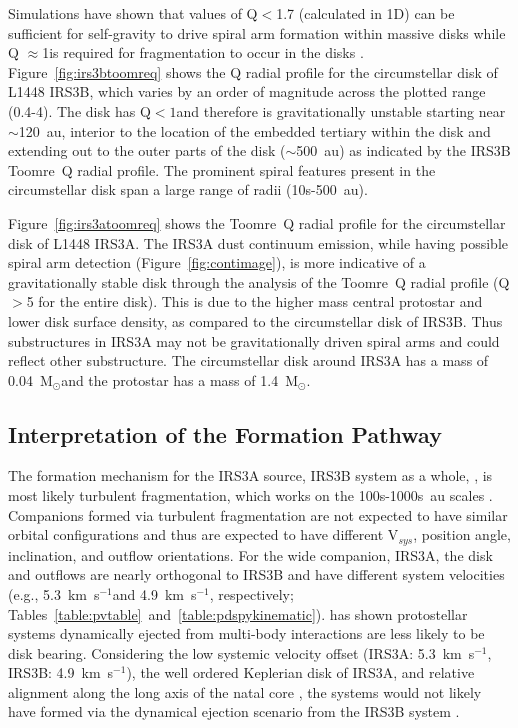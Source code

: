 \documentclass[twocolumn, 12pt,trackchanges]{aastex63}
\newcommand{\ab}{$\sim$}
\newcommand{\solm}{M$_{\odot}$}
\begin{document}
Simulations have shown that values of Q$<$1.7 (calculated in 1D) can be sufficient for self-gravity to drive spiral arm formation within massive disks while Q $\approx$1\space is required for fragmentation to occur in the disks \citep[][]{2010ApJ...710.1375K}. Figure~\ref{fig:irs3btoomreq} shows the Q radial profile for the circumstellar disk of L1448 IRS3B, which varies by an order of magnitude across the plotted range (0.4-4). The disk has Q$<1$\space and therefore is  gravitationally unstable starting near \ab120~au, interior to the location of the embedded tertiary within the disk and extending out to the outer parts of the disk (\ab500~au) as indicated by the IRS3B Toomre~Q radial profile. The prominent spiral features present in the circumstellar disk span a large range of radii (10s-500~au).

Figure~\ref{fig:irs3atoomreq} shows the Toomre~Q radial profile for the circumstellar disk of L1448 IRS3A. The IRS3A dust continuum emission, while having possible spiral arm detection (Figure~\ref{fig:contimage}), is more indicative of a gravitationally stable disk through the analysis of the Toomre~Q radial profile (Q$>$5 for the entire disk). This is due to the higher mass central protostar and lower disk surface density, as compared to the circumstellar disk of IRS3B. Thus substructures in IRS3A may not be gravitationally driven spiral arms and could reflect other substructure. The circumstellar disk around IRS3A has a mass of 0.04~\solm\space and the protostar has a mass of 1.4~\solm.


\subsection{Interpretation of the Formation Pathway}
The formation mechanism for the IRS3A source, IRS3B system as a whole, , is most likely turbulent fragmentation, which works on the 100s-1000s~au scales \citep[][]{2010ApJ...725.1485O, 2019ApJ...887..232L}. Companions formed via turbulent fragmentation are not expected to have similar orbital configurations and thus are expected to have different V$_{sys}$, position angle, inclination, and outflow orientations. For the wide companion, IRS3A, the disk and outflows are nearly orthogonal to IRS3B and have different system velocities (e.g., 5.3~km~s$^{-1}$\space and 4.9~km~s$^{-1}$, respectively; Tables~\ref{table:pvtable}~and~\ref{table:pdspykinematic}). \citet{2019ApJ...884....6M} has shown protostellar systems dynamically ejected from multi-body interactions are less likely to be disk bearing. Considering the low systemic velocity offset (IRS3A: 5.3~km~s$^{-1}$, IRS3B: 4.9~km~s$^{-1}$), the well ordered Keplerian disk of IRS3A, and relative alignment along the long axis of the natal core \citep{2017MNRAS.469.3881S}, the systems would not likely have formed via the dynamical ejection scenario from the IRS3B system \citep[][]{2012Natur.492..221R}.
\end{document}
